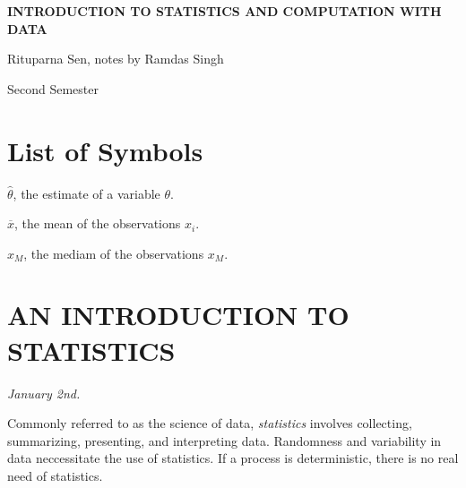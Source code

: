 \documentclass[15pt,a4paper]{book}
\theoremstyle{definition}
\newcommand{\eax}[1]{\emph{#1}\index{#1}} %
\begin{document}
\pagestyle{empty}

\begin{titlepage}
    \begin{center}
    \vspace*{\fill}
    {\Huge \textbf{\MakeUppercase{Introduction to Statistics and Computation with Data}}\par}

    \vspace{0.5cm} %
    {\Large Rituparna Sen, notes by Ramdas Singh\par}

    \vspace{0.5cm} %
    {\large Second Semester\par}
    \vspace*{\fill}
    \end{center}
\end{titlepage}

\clearpage


\chapter*{List of Symbols}
\begin{notationlist}
    \item $\hat{\theta}$, the estimate of a variable $\theta$.
    \item $\overline{x}$, the mean of the observations $x_{i}$.
    \item $x_{M}$, the mediam of the observations $x_{M}$.
\end{notationlist}

\newpage
\setcounter{tocdepth}{2}
\tableofcontents

\newpage
{}
\pagestyle{fancy}




\chapter{AN INTRODUCTION TO STATISTICS}

\textit{January 2nd.}

Commonly referred to as the science of data, \eax{statistics} involves collecting, summarizing, presenting, and interpreting data. Randomness and variability in data neccessitate the use of statistics. If a process is deterministic, there is no real need of statistics.
\end{document}
